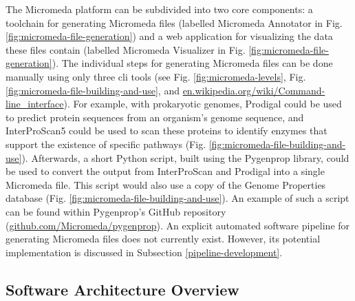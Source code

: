 The Micromeda platform can be subdivided into two core components: a 
toolchain for generating Micromeda files (labelled Micromeda Annotator in Fig. 
\ref{fig:micromeda-file-generation}) and a web application for visualizing the 
data these files contain (labelled Micromeda Visualizer in Fig. 
\ref{fig:micromeda-file-generation}). The individual steps for generating 
Micromeda files can be done manually using only three \gls{cli} tools (see Fig. 
\ref{fig:micromeda-levels}, Fig. \ref{fig:micromeda-file-building-and-use}, and  
\href{http://en.wikipedia.org/wiki/Command-line_interface}{en.wikipedia.org/wiki/Command-line\_interface}). 
For example, with prokaryotic genomes, Prodigal could be used to predict protein 
sequences from an organism's genome sequence, and InterProScan5 could be used to 
scan these proteins to identify enzymes that support the existence of specific 
pathways (Fig. \ref{fig:micromeda-file-building-and-use}). Afterwards, a short 
Python script, built using the Pygenprop library, could be used to convert the 
output from InterProScan and Prodigal into a single Micromeda file. This script 
would also use a copy of the Genome Properties database (Fig. 
\ref{fig:micromeda-file-building-and-use}). An example of such a script can be 
found within Pygenprop's GitHub repository 
(\href{http://github.com/Micromeda/pygenprop}{github.com/Micromeda/pygenprop}). 
An explicit automated software pipeline for generating Micromeda files does not 
currently exist. However, its potential implementation is discussed in 
Subsection \ref{pipeline-development}.


\subsection{Software Architecture Overview}

